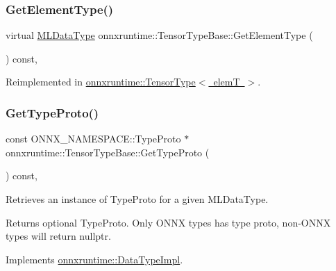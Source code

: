 \subsubsection{\texorpdfstring{Get\+Element\+Type()}{GetElementType()}}
{\footnotesize\ttfamily virtual \mbox{\hyperlink{namespaceonnxruntime_ad77d0a6e838ec7da5dc35fed5ee66b49}{M\+L\+Data\+Type}} onnxruntime\+::\+Tensor\+Type\+Base\+::\+Get\+Element\+Type (\begin{DoxyParamCaption}{ }\end{DoxyParamCaption}) const\hspace{0.3cm}{\ttfamily [inline]}, {\ttfamily [virtual]}}



Reimplemented in \mbox{\hyperlink{classonnxruntime_1_1TensorType_a63ac5e9ac296db98f04899fde5c2221e}{onnxruntime\+::\+Tensor\+Type$<$ elem\+T $>$}}.

\mbox{\label{classonnxruntime_1_1TensorTypeBase_a1689311da54ea3be4752cbf7dfa6054e}} 
\subsubsection{\texorpdfstring{Get\+Type\+Proto()}{GetTypeProto()}}
{\footnotesize\ttfamily const O\+N\+N\+X\+\_\+\+N\+A\+M\+E\+S\+P\+A\+C\+E\+::\+Type\+Proto $\ast$ onnxruntime\+::\+Tensor\+Type\+Base\+::\+Get\+Type\+Proto (\begin{DoxyParamCaption}{ }\end{DoxyParamCaption}) const\hspace{0.3cm}{\ttfamily [override]}, {\ttfamily [virtual]}}



Retrieves an instance of Type\+Proto for a given M\+L\+Data\+Type. 

\begin{DoxyReturn}{Returns}
optional Type\+Proto. Only O\+N\+NX types has type proto, non-\/\+O\+N\+NX types will return nullptr. 
\end{DoxyReturn}


Implements \mbox{\hyperlink{classonnxruntime_1_1DataTypeImpl_a9bea0ebb8f0d94ed5a1b541c160fa33a}{onnxruntime\+::\+Data\+Type\+Impl}}.

\mbox{\label{classonnxruntime_1_1TensorTypeBase_a24c6755da5656503337ec14e9a4ebbf8}} 
